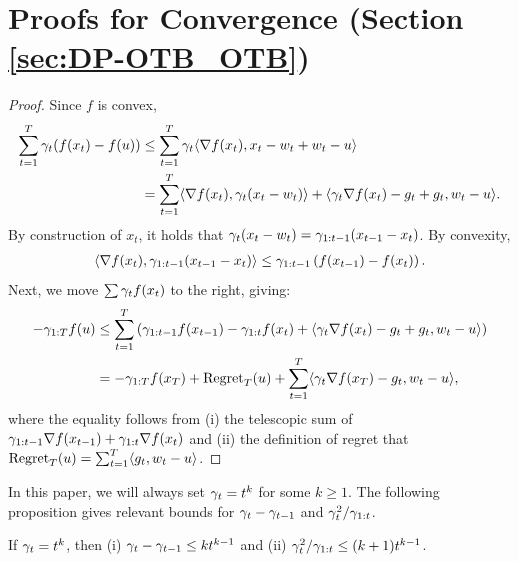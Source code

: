 \section{Proofs for Convergence (Section \ref{sec:DP-OTB_OTB})}
\label{app:DP-OTB:proof-A}

\LemAnytimeOTB*

\begin{proof}
Since $f$ is convex,
\begin{align*}
    \sum_{t=1}^T \gamma_t ( f(x_t) - f(u) )
    &\leq \sum_{t=1}^T \gamma_t \langle \nabla f(x_t), x_t-w_t+w_t-u \rangle \\
    &= \sum_{t=1}^T \langle\nabla f(x_t), \gamma_t(x_t-w_t)\rangle + \langle \gamma_t\nabla f(x_t)-g_t+g_t, w_t-u\rangle.
\end{align*}
By construction of $x_t$, it holds that $\gamma_t(x_t-w_t) = \gamma_{1:t-1}(x_{t-1}-x_t)$. By convexity,
\begin{align*}
    \langle \nabla f(x_t), \gamma_{1:t-1}(x_{t-1}-x_t) \rangle \leq \gamma_{1:t-1} \left( f(x_{t-1}) - f(x_t) \right).
\end{align*}
Next, we move $\sum \gamma_tf(x_t)$ to the right, giving:
\begin{align*}
    -\gamma_{1:T} f(u) 
    &\leq \sum_{t=1}^T \left( \gamma_{1:t-1}f(x_{t-1}) - \gamma_{1:t}f(x_t) + \langle \gamma_t\nabla f(x_t)-g_t+g_t,w_t-u\rangle \right) \\
    &= -\gamma_{1:T}f(x_T) + \mathrm{Regret}_T(u) + \sum_{t=1}^T \langle \gamma_t\nabla f(x_T) - g_t,w_t-u\rangle,
\end{align*}
where the equality follows from (i) the telescopic sum of $\gamma_{1:t-1}\nabla f(x_{t-1})+\gamma_{1:t}\nabla f(x_t)$ and (ii) the definition of regret that $\mathrm{Regret}_T(u)=\sum_{t=1}^T \langle g_t,w_t-u\rangle$.
\end{proof}

In this paper, we will always set $\gamma_t=t^k$ for some $k\geq 1$. The following proposition gives relevant bounds for $\gamma_t-\gamma_{t-1}$ and $\gamma_t^2/\gamma_{1:t}$.

\begin{proposition}
\label{prop:DP-OTB:alphas}
If $\gamma_t=t^k$, then (i) $\gamma_t-\gamma_{t-1} \leq kt^{k-1}$ and (ii) $\gamma_t^2/\gamma_{1:t} \leq (k+1)t^{k-1}$.
\end{proposition}

